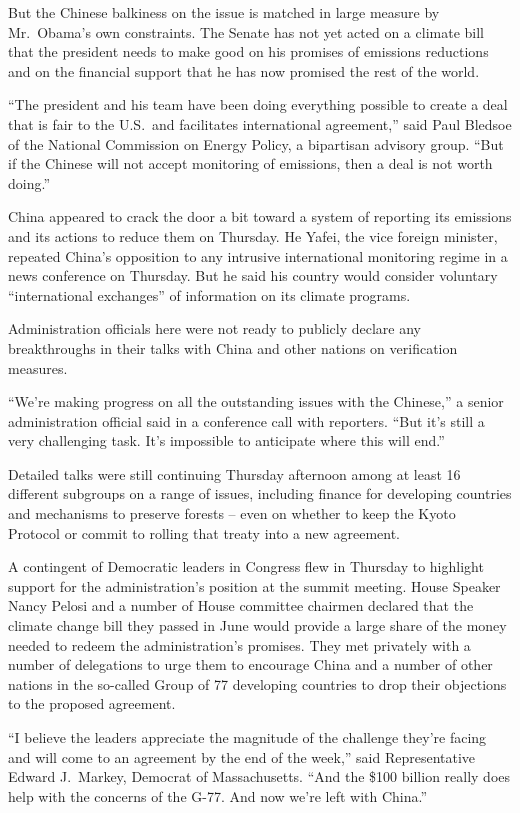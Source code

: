 ﻿\documentclass[12pt]{article}
\begin{document}
But the Chinese balkiness on the issue is matched in large measure by Mr.~Obama's own constraints.
The Senate has not yet acted on a climate bill that the president needs to make good on his promises
of emissions reductions and on the financial support that he has now promised the rest of the world.

``The president and his team have been doing everything possible to create a deal that is fair to
the U.S.~and facilitates international agreement,'' said Paul Bledsoe of the National Commission on
Energy Policy, a bipartisan advisory group. ``But if the Chinese will not accept monitoring of
emissions, then a deal is not worth doing.''

China appeared to crack the door a bit toward a system of reporting its emissions and its actions to
reduce them on Thursday. He Yafei, the vice foreign minister, repeated China's opposition to any
intrusive international monitoring regime in a news conference on Thursday. But he said his country
would consider voluntary ``international exchanges'' of information on its climate programs.

Administration officials here were not ready to publicly declare any breakthroughs in their talks
with China and other nations on verification measures.

``We're making progress on all the outstanding issues with the Chinese,'' a senior administration
official said in a conference call with reporters. ``But it's still a very challenging task. It's
impossible to anticipate where this will end.''

Detailed talks were still continuing Thursday afternoon among at least 16 different subgroups on a
range of issues, including finance for developing countries and mechanisms to preserve forests --
even on whether to keep the Kyoto Protocol or commit to rolling that treaty into a new agreement.

A contingent of Democratic leaders in Congress flew in Thursday to highlight support for the
administration's position at the summit meeting. House Speaker Nancy Pelosi and a number of House
committee chairmen declared that the climate change bill they passed in June would provide a large
share of the money needed to redeem the administration's promises. They met privately with a number
of delegations to urge them to encourage China and a number of other nations in the so-called Group
of 77 developing countries to drop their objections to the proposed agreement.

``I believe the leaders appreciate the magnitude of the challenge they're facing and will come to an
agreement by the end of the week,'' said Representative Edward J.~Markey, Democrat of Massachusetts.
``And the \$100 billion really does help with the concerns of the G-77. And now we're left with
China.''
\end{document}

